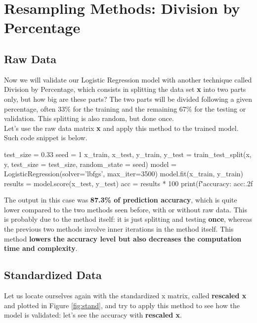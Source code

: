 \documentclass[11pt]{article}
\begin{document}
\section{Resampling Methods: Division by Percentage}

\subsection{Raw Data}

Now we will validate our Logistic Regression model with another technique called Division by Percentage, which consists in splitting the data set \textbf{x} into two parts only, but how big are these parts? The two parts will be divided following a given percentage, often 33\% for the training and the remaining 67\% for the testing or validation. This splitting is also random, but done once.
\\

Let's use the raw data matrix \textbf{x} and apply this method to the trained model. Such code snippet is below.
\\

\begin{python}
test_size = 0.33
seed = 1
x_train, x_test, y_train, y_test = train_test_split(x, y, test_size = test_size, random_state = seed)
model = LogisticRegression(solver='lbfgs', max_iter=3500)
model.fit(x_train, y_train)
results = model.score(x_test, y_test)
acc = results * 100
print(f"accuracy: {acc:.2f}%
\end{python}

The output in this case was \textbf{87.3\% of prediction accuracy}, which is quite lower compared to the two methods seen before, with or without raw data. This is probably due to the method itself: it is just splitting and testing \textbf{once}, whereas the previous two methods involve inner iterations in the method itself. This method \textbf{lowers the accuracy level but also decreases the computation time and complexity}.

\subsection{Standardized Data}

Let us locate ourselves again with the standardized x matrix, called \textbf{rescaled x} and plotted in Figure \ref{fig:stand}, and try to apply this method to see how the model is validated: let's see the accuracy with \textbf{rescaled x}.
\\
\end{document}
